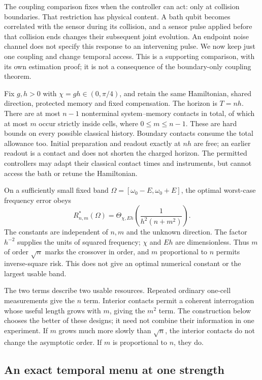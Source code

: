 \documentclass[11pt,a4paper]{article}
\numberwithin{equation}{section}
\theoremstyle{remark}
\begin{document}
The coupling comparison fixes when the controller can act: only at collision
boundaries. That restriction has physical content. A bath qubit becomes
correlated with the sensor during its collision, and a sensor pulse applied
before that collision ends changes their subsequent joint evolution. An
endpoint noise channel does not specify this response to an intervening pulse.
We now keep just one coupling and change temporal access. This is a supporting
comparison, with its own estimation proof; it is not a consequence of the
boundary-only coupling theorem.

Fix $g,h>0$ with $\chi=gh\in(0,\pi/4)$, and retain the same Hamiltonian,
shared direction, protected memory and fixed compensation. The horizon is
$T=nh$. There are at most $n-1$ nonterminal system--memory contacts in total,
of which at most $m$ occur strictly inside cells, where $0\le m\le n-1$.
These are hard bounds on every possible classical history. Boundary contacts
consume the total allowance too. Initial preparation and readout exactly at
$nh$ are free; an earlier readout is a contact and does not shorten the
charged horizon. The permitted controllers may adapt their classical contact
times and instruments, but cannot access the bath or retune the Hamiltonian.

On a sufficiently small fixed band
$\Omega=[\omega_0-E,\omega_0+E]$, the optimal worst-case frequency error obeys
\begin{equation}
 R_{n,m}^{*}(\Omega)
 =\Theta_{\chi,Eh}\!\left(\frac{1}{h^2(n+m^2)}\right).
 \label{time:contactlaw}
\end{equation}
The constants are independent of $n,m$ and the unknown direction. The factor
$h^{-2}$ supplies the units of squared frequency; $\chi$ and $Eh$ are
dimensionless. Thus $m$ of order $\sqrt n$ marks the crossover in order, and
$m$ proportional to $n$ permits inverse-square risk. This does not give an
optimal numerical constant or the largest usable band.

The two terms describe two usable resources. Repeated ordinary one-cell
measurements give the $n$ term. Interior contacts permit a coherent
interrogation whose useful length grows with $m$, giving the $m^2$ term.
The construction below chooses the better of these designs; it need not
combine their information in one experiment. If $m$ grows much more slowly
than $\sqrt n$, the interior contacts do not change the asymptotic order.
If $m$ is proportional to $n$, they do.

\subsection{An exact temporal menu at one strength}
\end{document}
